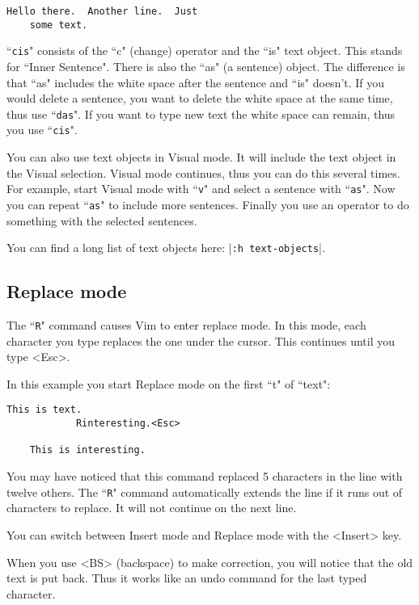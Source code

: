 \begin{Verbatim}[samepage=true]
    Hello there.  Another line.  Just
    some text.
\end{Verbatim}

``\texttt{cis}" consists of the ``c" (change) operator and the ``is" text object.
This stands for ``Inner Sentence".
There is also the ``as" (a sentence) object.
The difference is that ``as" includes the white space after the sentence and ``is" doesn't.
If you would delete a sentence, you want to delete the white space at the same time, thus use ``\texttt{das}".
If you want to type new text the white space can remain, thus you use ``\texttt{cis}".

You can also use text objects in Visual mode.
It will include the text object in the Visual selection.
Visual mode continues, thus you can do this several times.
For example, start Visual mode with ``\texttt{v}" and select a sentence with ``\texttt{as}".
Now you can repeat ``\texttt{as}" to include more sentences.
Finally you use an operator to do something with the selected sentences.

You can find a long list of text objects here: |\texttt{:h text-objects}|.

\subsection{Replace mode}
\label{Replace mode}

The ``\texttt{R}" command causes Vim to enter replace mode.
In this mode, each character you type replaces the one under the cursor.
This continues until you type <Esc>.

In this example you start Replace mode on the first ``t" of ``text":

\begin{Verbatim}[samepage=true]
    This is text.
            Rinteresting.<Esc>

    This is interesting.
\end{Verbatim}

You may have noticed that this command replaced 5 characters in the line with twelve others.
The ``\texttt{R}" command automatically extends the line if it runs out of characters to replace.
It will not continue on the next line.

You can switch between Insert mode and Replace mode with the <Insert> key.

When you use <BS> (backspace) to make correction, you will notice that the old text is put back.
Thus it works like an undo command for the last typed character.


